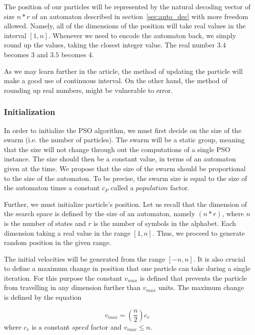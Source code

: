\documentclass{article}
\begin{document}
The position of our particles will be represented by the natural decoding vector of size $n*r$ of an automaton described in section~\ref{sec:auto_dec} with more freedom allowed. Namely, all of the dimensions of the position will take real values in the interval $[1, n]$. Whenever we need to encode the automaton back, we simply round up the values, taking the closest integer value. The real number $3.4$ becomes $3$ and $3.5$ becomes 4.

As we may learn further in the article, the method of updating the particle will make a good use of continuous interval. On the other hand, the method of rounding up real numbers, might be vulnerable to error.



\subsubsection{Initialization}
In order to initialize the PSO algorithm, we must first decide on the size of the swarm (i.e. the number of particles). The swarm will be a static group, meaning that the size will not change through out the computations of a single PSO instance. The size should then be a constant value, in terms of an automaton given at the time. We propose that the size of the swarm should be proportional to the size of the automaton. To be precise, the swarm size is equal to the size of the automaton times a constant $c_P$ called a $population$ factor.

Further, we must initialize particle's position. Let us recall that the dimension of the search space is defined by the size of an automaton, namely $(n*r)$, where $n$ is the number of states and $r$ is the number of symbols in the alphabet. Each dimension taking a real value in the range $[1, n]$. Thus, we proceed to generate random position in the given range.

The initial velocities will be generated from the range $[-n,n]$. It is also crucial to define a maximum change in position that one particle can take during a single iteration. For this purpose the constant $v_{max}$ is defined that prevents the particle from travelling in any dimension further than $v_{max}$ units. The maximum change is defined by the equation 

\begin{equation}
	v_{max} = (\frac{n}{2})c_{v}
\end{equation}
where $c_{v}$ is a constant $speed$ factor and $v_{max} \leq n$.
\end{document}
